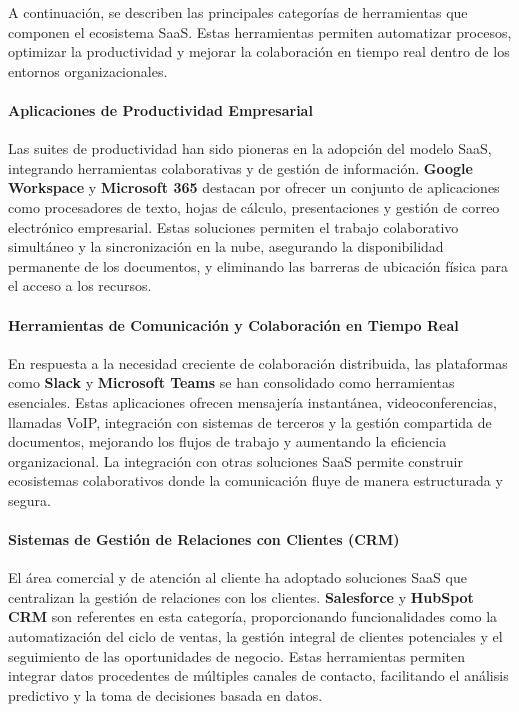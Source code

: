 {            A continuación, se describen las principales categorías de herramientas que componen el ecosistema SaaS. Estas herramientas permiten automatizar procesos, optimizar la productividad y mejorar la colaboración en tiempo real dentro de los entornos organizacionales.
            
            \paragraph{Aplicaciones de Productividad Empresarial} Las suites de productividad han sido pioneras en la adopción del modelo SaaS, integrando herramientas colaborativas y de gestión de información. \textbf{Google Workspace} y \textbf{Microsoft 365} destacan por ofrecer un conjunto de aplicaciones como procesadores de texto, hojas de cálculo, presentaciones y gestión de correo electrónico empresarial. Estas soluciones permiten el trabajo colaborativo simultáneo y la sincronización en la nube, asegurando la disponibilidad permanente de los documentos, y eliminando las barreras de ubicación física para el acceso a los recursos.
            
            \paragraph{Herramientas de Comunicación y Colaboración en Tiempo Real} En respuesta a la necesidad creciente de colaboración distribuida, las plataformas como \textbf{Slack} y \textbf{Microsoft Teams} se han consolidado como herramientas esenciales. Estas aplicaciones ofrecen mensajería instantánea, videoconferencias, llamadas VoIP, integración con sistemas de terceros y la gestión compartida de documentos, mejorando los flujos de trabajo y aumentando la eficiencia organizacional. La integración con otras soluciones SaaS permite construir ecosistemas colaborativos donde la comunicación fluye de manera estructurada y segura.
            
            \paragraph{Sistemas de Gestión de Relaciones con Clientes (CRM)} El área comercial y de atención al cliente ha adoptado soluciones SaaS que centralizan la gestión de relaciones con los clientes. \textbf{Salesforce} y \textbf{HubSpot CRM} son referentes en esta categoría, proporcionando funcionalidades como la automatización del ciclo de ventas, la gestión integral de clientes potenciales y el seguimiento de las oportunidades de negocio. Estas herramientas permiten integrar datos procedentes de múltiples canales de contacto, facilitando el análisis predictivo y la toma de decisiones basada en datos.
            
}
